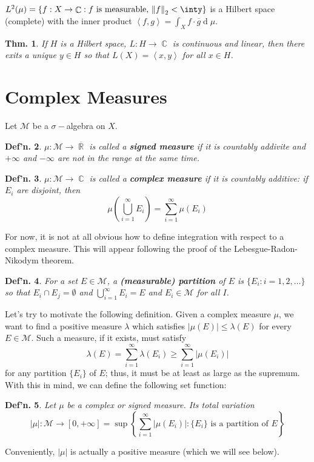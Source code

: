 \documentclass[12pt, a4paper]{book}
\DeclareMathOperator{\R}{\mathbb{R}}
\DeclareMathOperator{\C}{\mathbb{C}}
\renewcommand{\d}[1]{\ensuremath{\operatorname{d}\!{#1}}} %
\newcommand{\inner}[2]{\left\langle #1, #2 \right\rangle} %
\newcommand{\norm}[1]{\left\lVert#1\right\rVert} %
\newtheorem{theorem}{Thm.}[section]
\newtheorem{definition}[theorem]{Def'n.}
\theoremstyle{nonumberplain}
\begin{document}
$L^2(\mu)=\{f:X\to\C:f\text{ is measurable, $\norm{f}_2<\inty$}\}$ is a Hilbert space (complete) with the inner product $\inner{f}{g}=\int_Xf\cdot\overline{g}\d{\mu}$.
\begin{theorem}
    If $H$ is a Hilbert space, $L:H\to\C$ is continuous and linear, then there exits a unique $y\in H$ so that $L(X)=\inner{x}{y}$ for all $x\in H$.
\end{theorem}
\section{Complex Measures}
Let $\mathcal{M}$ be a $\sigma-$algebra on $X$.
\begin{definition}
    $\mu:\mathcal{M}\to\overline{\R}$ is called a \textbf{signed measure} if it is countably addivite and $+\infty$ and $-\infty$ are not in the range at the same time.
\end{definition}
\begin{definition}
    $\mu:\mathcal{M}\to\C$ is called a \textbf{complex measure} if it is countably additive: if $E_i$ are disjoint, then
    \[\mu\left(\bigcup\limits_{i=1}^\infty E_i\right)=\sum\limits_{i=1}^\infty \mu(E_i)\]
\end{definition}
For now, it is not at all obvious how to define integration with respect to a complex measure.
This will appear following the proof of the Lebesgue-Radon-Nikodym theorem.
\begin{definition}
    For a set $E\in\mathcal{M}$, a \textbf{(measurable) partition} of $E$ is $\{E_i:i=1,2,\ldots\}$ so that $E_i\cap E_j=\emptyset$ and $\bigcup_{i=1}^\infty E_i=E$ and $E_i\in\mathcal{M}$ for all $I$.
\end{definition}
Let's try to motivate the following definition.
Given a complex measure $\mu$, we want to find a positive measure $\lambda$ which satisfies $|\mu(E)|\leq\lambda(E)$ for every $E\in\mathcal{M}$.
Such a measure, if it exists, must satisfy
\[\lambda(E)=\sum\limits_{i=1}^\infty\lambda(E_i)\geq\sum\limits_{i=1}^\infty|\mu(E_i)|\]
for any partition $\{E_i\}$ of $E$; thus, it must be at least as large as the supremum.
With this in mind, we can define the following set function:
\begin{definition}
    Let $\mu$ be a complex or signed measure.
    Its total variation
    \[|\mu|:\mathcal{M}\to[0,+\infty]=\sup\left\{\sum\limits_{i=1}^\infty |\mu(E_i)|:\{E_i\}\text{ is a partition of $E$}\right\}\]
\end{definition}
Conveniently, $|\mu|$ is actually a positive measure (which we will see below).
\end{document}
